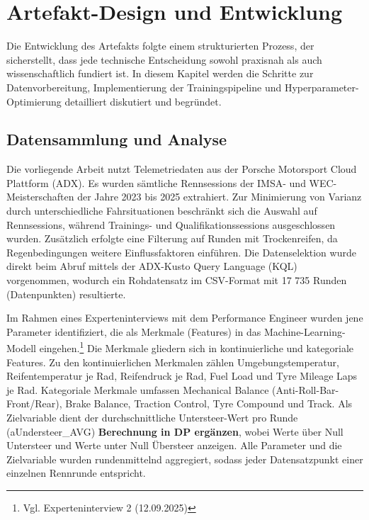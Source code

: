\chapter{Artefakt-Design und Entwicklung}

Die Entwicklung des Artefakts folgte einem strukturierten Prozess, der sicherstellt, dass jede technische Entscheidung sowohl praxisnah als auch wissenschaftlich fundiert ist. In diesem Kapitel werden die Schritte zur Datenvorbereitung, Implementierung der Trainingspipeline und Hyperparameter-Optimierung detailliert diskutiert und begründet.

\section{Datensammlung und Analyse}

  Die vorliegende Arbeit nutzt Telemetriedaten aus der Porsche Motorsport Cloud Plattform (ADX). Es wurden sämtliche Rennsessions der IMSA- und WEC-Meisterschaften der Jahre 2023 bis 2025 extrahiert. Zur Minimierung von Varianz durch unterschiedliche Fahrsituationen beschränkt sich die Auswahl auf Rennsessions, während Trainings- und Qualifikationssessions ausgeschlossen wurden. Zusätzlich erfolgte eine Filterung auf Runden mit Trockenreifen, da Regenbedingungen weitere Einflussfaktoren einführen. Die Datenselektion wurde direkt beim Abruf mittels der ADX-Kusto Query Language (KQL) vorgenommen, wodurch ein Rohdatensatz im CSV-Format mit 17 735 Runden (Datenpunkten) resultierte.

  Im Rahmen eines Experteninterviews mit dem Performance Engineer wurden jene Parameter identifiziert, die als Merkmale (Features) in das Machine-Learning-Modell eingehen.\footnote{Vgl. Experteninterview 2 (12.09.2025)} Die Merkmale gliedern sich in kontinuierliche und kategoriale Features. Zu den kontinuierlichen Merkmalen zählen Umgebungstemperatur, Reifentemperatur je Rad, Reifendruck je Rad, Fuel Load und Tyre Mileage Laps je Rad. Kategoriale Merkmale umfassen Mechanical Balance (Anti-Roll-Bar-Front/Rear), Brake Balance, Traction Control, Tyre Compound und Track. 
  Als Zielvariable dient der durchschnittliche Untersteer-Wert pro Runde (aUndersteer\_AVG) \textbf{Berechnung in DP ergänzen}, wobei Werte über Null Untersteer und Werte unter Null Übersteer anzeigen. Alle Parameter und die Zielvariable wurden rundenmittelnd aggregiert, sodass jeder Datensatzpunkt einer einzelnen Rennrunde entspricht.

